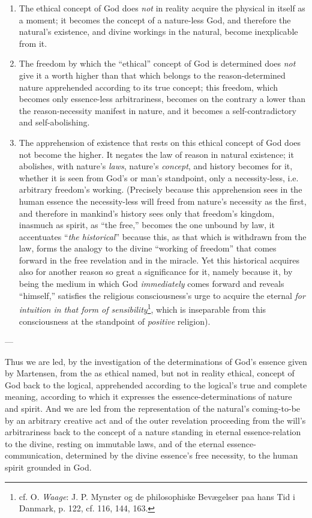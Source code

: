 \documentclass[12pt,a4paper]{book}
\begin{document}
\begin{enumerate}
\item The ethical concept of God does \emph{not} in reality acquire the physical in itself as
  a moment; it becomes the concept of a nature-less God, and therefore the
  natural's existence, and divine workings in the natural, become inexplicable from it.
\item The freedom by which the ``ethical'' concept of God is determined does \emph{not} give it
  a worth higher than that which belongs to the reason-determined nature apprehended
  according to its true concept; this freedom, which becomes only essence-less
  arbitrariness, becomes on the contrary a lower than the reason-necessity manifest in
  nature, and it becomes a self-contradictory and self-abolishing.
\item The apprehension of existence that rests on this ethical concept of God does not
  become the higher. It negates the law of reason in natural existence; it abolishes,
  with nature's \emph{laws}, nature's \emph{concept}, and history becomes for it, whether
  it is seen from God's or man's standpoint, only a necessity-less, i.e. arbitrary
  freedom's working. (Precisely because this apprehension sees in the human essence the
  necessity-less will freed from nature's necessity as the first, and therefore in
  mankind's history sees only that freedom's kingdom, inasmuch as spirit, as ``the free,''
  becomes the one unbound by law, it accentuates ``\emph{the historical}'' because this, as that
  which is withdrawn from the law, forms the analogy to the divine ``working of freedom''
  that comes forward in the free revelation and in the miracle. Yet this historical
  acquires also for another reason so great a significance for it, namely because it, by
  being the medium in which God \emph{immediately} comes forward and reveals ``himself,''
  satisfies the religious consciousness's urge to acquire the eternal \emph{for intuition
  in that form of sensibility}\footnote{cf. O. \emph{Waage}: J. P. Mynster og de philosophiske
  Bevægelser paa hans Tid i Danmark, p. 122, cf. 116, 144, 163.}, which is inseparable
  from this consciousness at the standpoint of \emph{positive} religion).
\end{enumerate}

\begin{center}---\end{center}

Thus we are led, by the investigation of the determinations of God's essence given by
Martensen, from the as ethical named, but not in reality ethical, concept of God back to
the logical, apprehended according to the logical's true and complete meaning, according
to which it expresses the essence-determinations of nature and spirit. And we are led from
the representation of the natural's coming-to-be by an arbitrary creative act and of the
outer revelation proceeding from the will's arbitrariness back to the concept of a nature
standing in eternal essence-relation to the divine, resting on immutable laws, and of the
eternal essence-communication, determined by the divine essence's free necessity, to the
human spirit grounded in God.
\end{document}
